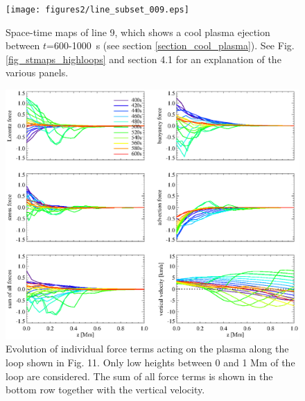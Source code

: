 \documentclass{aa}
\begin{document}
{\begin{figure}[!h]
\texttt{[image: figures2/line\_subset\_009.eps]}
\caption{Space-time maps of line 9, which shows a cool plasma ejection between $t$=600-1000~s (see section \ref{section_cool_plasma}). See Fig. \ref{fig_stmaps_highloops} and section 4.1 for an explanation of the various panels.\label{fig_stmaps_wave}}
\end{figure}


\begin{figure}[!h]
\sidecaption
\begin{minipage}{12cm}
\includegraphics[width=\textwidth]{figures2/cool_ejection_forces.eps}
\end{minipage}
\caption{Evolution of individual force terms acting on the plasma along the loop shown in Fig. 11. Only low heights between 0 and 1 Mm of the loop are considered. The sum of all force terms is shown in the bottom row together with the vertical velocity. \label{forces}}
\end{figure}





}
\end{document}
